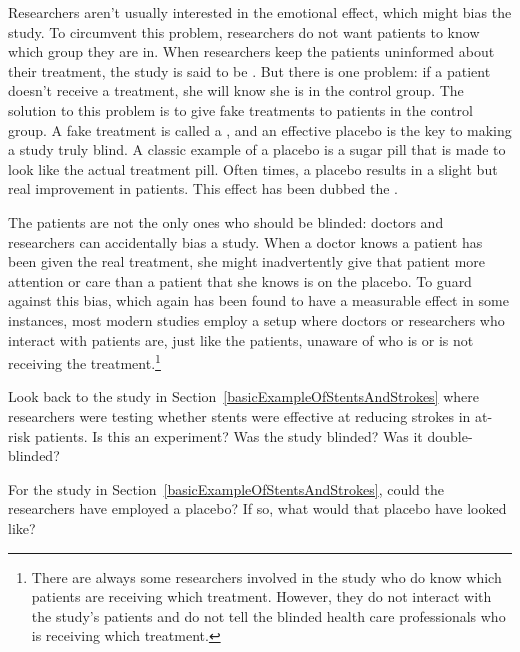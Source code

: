Researchers aren't usually interested in the emotional effect,
which might bias the study.
To circumvent this problem, researchers do not want patients
to know which group they are in.
When researchers keep the patients uninformed about their
treatment, the study is said to be .
But there is one problem:
if a patient doesn't receive a treatment, she will know she
is in the control group.
The solution to this problem is to give fake treatments to
patients in the control group.
A fake treatment is called a , and an effective
placebo is the key to making a study truly blind.
A classic example of a placebo is a sugar pill that is made
to look like the actual treatment pill.
Often times, a placebo results in a slight but real
improvement in patients.
This effect has been dubbed the .

The patients are not the only ones who should be blinded:
doctors and researchers can accidentally bias a study.
When a doctor knows a patient has been given the real treatment,
she might inadvertently give that patient more attention or care
than a patient that she knows is on the placebo.
To guard against this bias, which again has been found to have
a measurable effect in some instances, most modern studies employ
a  setup where doctors or researchers who
interact with patients are, just like the patients,
unaware of who is or is not receiving the
treatment.\footnote{There are always some researchers involved
  in the study who do know which patients are receiving which
  treatment.
  However, they do not interact with the study's patients and
  do not tell the blinded health care professionals who is
  receiving which treatment.}

\begin{exercisewrap}
\begin{nexercise}
Look back to the study in Section~\ref{basicExampleOfStentsAndStrokes} where researchers were testing whether stents were effective at reducing strokes in at-risk patients. Is this an experiment? Was the study blinded? Was it double-blinded?\footnotemark{}
\end{nexercise}
\end{exercisewrap}

\begin{exercisewrap}
\begin{nexercise}
\label{gp_sham_surgery}%
For the study in Section~\ref{basicExampleOfStentsAndStrokes},
could the researchers have employed a placebo?
If so, what would that placebo have looked like?\footnotemark{}
\end{nexercise}
\end{exercisewrap}

